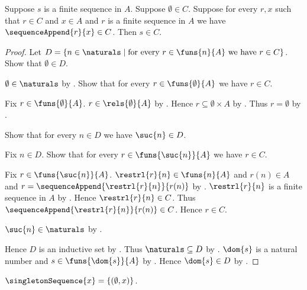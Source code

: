 \begin{theorem}\label{finite_sequence_induction}
    Suppose $s$ is a finite sequence in $A$.
    Suppose $\emptyset\in C$.
    Suppose for every $r,x$ such that $r\in C$ and $x\in A$ and
        $r$ is a finite sequence in $A$ we have
        $\sequenceAppend{r}{x}\in C$.
    Then $s\in C$.
\end{theorem}
\begin{proof}
    Let $D=\{n\in\naturals\mid
        \text{for every $r\in\funs{n}{A}$ we have $r\in C$}\}$.
    Show that $\emptyset\in D$.
    \begin{subproof}
        $\emptyset\in\naturals$ by .
        Show that for every $r\in\funs{\emptyset}{A}$ we have $r\in C$.
        \begin{subproof}
            Fix $r\in\funs{\emptyset}{A}$.
            $r\in\rels{\emptyset}{A}$
                by .
            Hence $r\subseteq\emptyset\times A$ by .
            Thus $r=\emptyset$
                by .
        \end{subproof}
    \end{subproof}
    Show that for every $n\in D$ we have $\suc{n}\in D$.
    \begin{subproof}
        Fix $n\in D$.
        Show that for every $r\in\funs{\suc{n}}{A}$ we have $r\in C$.
        \begin{subproof}
            Fix $r\in\funs{\suc{n}}{A}$.
            $\restrl{r}{n}\in\funs{n}{A}$ and
                $r(n)\in A$ and
                $r=\sequenceAppend{\restrl{r}{n}}{r(n)}$
                by .
            $\restrl{r}{n}$ is a finite sequence in $A$
                by .
            Hence $\restrl{r}{n}\in C$.
            Thus $\sequenceAppend{\restrl{r}{n}}{r(n)}\in C$.
            Hence $r\in C$.
        \end{subproof}
        $\suc{n}\in\naturals$ by .
    \end{subproof}
    Hence $D$ is an inductive set by .
    Thus $\naturals\subseteq D$ by .
    $\dom{s}$ is a natural number and $s\in\funs{\dom{s}}{A}$
        by .
    Hence $\dom{s}\in D$ by .
\end{proof}

\begin{definition}\label{singleton_sequence}
    $\singletonSequence{x}=\{(\emptyset,x)\}$.
\end{definition}

